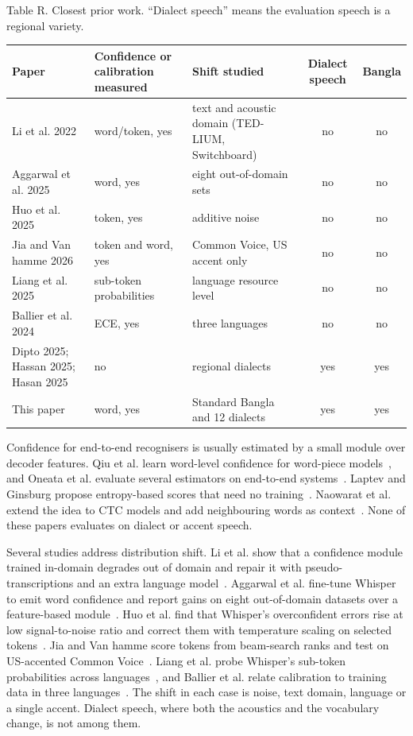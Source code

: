 \documentclass[10pt]{article}
\begin{document}
\begin{table}[htb]
\centering
\par\noindent\begin{minipage}{\linewidth}\small Table R. Closest prior work. ``Dialect speech'' means the evaluation speech is a regional variety.\end{minipage}\par\smallskip
\footnotesize
\begin{tabular}{p{3.4cm}p{2.9cm}p{4.6cm}cc}
\hline
\textbf{Paper} & \textbf{Confidence or calibration measured} & \textbf{Shift studied} & \textbf{Dialect speech} & \textbf{Bangla} \\ \hline
Li et al. 2022 & word/token, yes & text and acoustic domain (TED-LIUM, Switchboard) & no & no \\
Aggarwal et al. 2025 & word, yes & eight out-of-domain sets & no & no \\
Huo et al. 2025 & token, yes & additive noise & no & no \\
Jia and Van hamme 2026 & token and word, yes & Common Voice, US accent only & no & no \\
Liang et al. 2025 & sub-token probabilities & language resource level & no & no \\
Ballier et al. 2024 & ECE, yes & three languages & no & no \\
Dipto 2025; Hassan 2025; Hasan 2025 & no & regional dialects & yes & yes \\
This paper & word, yes & Standard Bangla and 12 dialects & yes & yes \\
\hline\end{tabular}
\end{table}


Confidence for end-to-end recognisers is usually estimated by a small module over decoder features. Qiu et al. learn word-level confidence for word-piece models~\cite{Qiu2021}, and Oneata et al. evaluate several estimators on end-to-end systems~\cite{Oneata2021}. Laptev and Ginsburg propose entropy-based scores that need no training~\cite{Laptev2022}. Naowarat et al. extend the idea to CTC models and add neighbouring words as context~\cite{Naowarat2023}. None of these papers evaluates on dialect or accent speech.


Several studies address distribution shift. Li et al. show that a confidence module trained in-domain degrades out of domain and repair it with pseudo-transcriptions and an extra language model~\cite{Li2022}. Aggarwal et al. fine-tune Whisper to emit word confidence and report gains on eight out-of-domain datasets over a feature-based module~\cite{Aggarwal2025}. Huo et al. find that Whisper's overconfident errors rise at low signal-to-noise ratio and correct them with temperature scaling on selected tokens~\cite{Huo2025}. Jia and Van hamme score tokens from beam-search ranks and test on US-accented Common Voice~\cite{Jia2026}. Liang et al. probe Whisper's sub-token probabilities across languages~\cite{Liang2025}, and Ballier et al. relate calibration to training data in three languages~\cite{Ballier2024}. The shift in each case is noise, text domain, language or a single accent. Dialect speech, where both the acoustics and the vocabulary change, is not among them.
\end{document}
